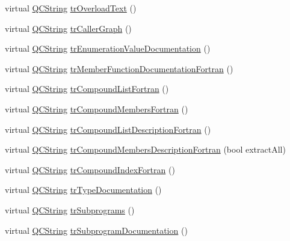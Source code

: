 \begin{DoxyCompactItemize}
virtual \mbox{\hyperlink{class_q_c_string}{Q\+C\+String}} \mbox{\hyperlink{class_translator_indonesian_a8ac8bb07a59c063c22fcffa4c04db017}{tr\+Overload\+Text}} ()
\item 
virtual \mbox{\hyperlink{class_q_c_string}{Q\+C\+String}} \mbox{\hyperlink{class_translator_indonesian_a4b47ece1d7a23c18d7cc1fd9d44d07b5}{tr\+Caller\+Graph}} ()
\item 
virtual \mbox{\hyperlink{class_q_c_string}{Q\+C\+String}} \mbox{\hyperlink{class_translator_indonesian_af1e251ffec041e91a4aae107ded06676}{tr\+Enumeration\+Value\+Documentation}} ()
\item 
virtual \mbox{\hyperlink{class_q_c_string}{Q\+C\+String}} \mbox{\hyperlink{class_translator_indonesian_a73d636f40870477629500c60d740a214}{tr\+Member\+Function\+Documentation\+Fortran}} ()
\item 
virtual \mbox{\hyperlink{class_q_c_string}{Q\+C\+String}} \mbox{\hyperlink{class_translator_indonesian_a4c7afa351c3e5f842da2d237e0485ee1}{tr\+Compound\+List\+Fortran}} ()
\item 
virtual \mbox{\hyperlink{class_q_c_string}{Q\+C\+String}} \mbox{\hyperlink{class_translator_indonesian_aed150873d2ebf9ff9c81a7194ed87c4b}{tr\+Compound\+Members\+Fortran}} ()
\item 
virtual \mbox{\hyperlink{class_q_c_string}{Q\+C\+String}} \mbox{\hyperlink{class_translator_indonesian_a640a53af037adc22cc1cdc49700e950b}{tr\+Compound\+List\+Description\+Fortran}} ()
\item 
virtual \mbox{\hyperlink{class_q_c_string}{Q\+C\+String}} \mbox{\hyperlink{class_translator_indonesian_aca50e282244ae47f2f454d95ca2e48a5}{tr\+Compound\+Members\+Description\+Fortran}} (bool extract\+All)
\item 
virtual \mbox{\hyperlink{class_q_c_string}{Q\+C\+String}} \mbox{\hyperlink{class_translator_indonesian_a89ec10f8d8f07c023597713dc0cfead7}{tr\+Compound\+Index\+Fortran}} ()
\item 
virtual \mbox{\hyperlink{class_q_c_string}{Q\+C\+String}} \mbox{\hyperlink{class_translator_indonesian_a7ce5f320693eb175d7ad73e65e4eb878}{tr\+Type\+Documentation}} ()
\item 
virtual \mbox{\hyperlink{class_q_c_string}{Q\+C\+String}} \mbox{\hyperlink{class_translator_indonesian_a7653ab180fa3a2e705cd457943b90aa0}{tr\+Subprograms}} ()
\item 
virtual \mbox{\hyperlink{class_q_c_string}{Q\+C\+String}} \mbox{\hyperlink{class_translator_indonesian_af25346c99ac7a9f69cb104209d2b941b}{tr\+Subprogram\+Documentation}} ()

\end{DoxyCompactItemize}
